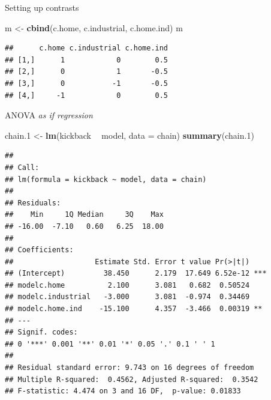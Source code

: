 \documentclass[ignorenonframetext,]{beamer}
\newenvironment{Shaded}{\begin{snugshade}}{\end{snugshade}}
\newcommand{\DataTypeTok}[1]{\textcolor[rgb]{0.13,0.29,0.53}{#1}}
\newcommand{\FloatTok}[1]{\textcolor[rgb]{0.00,0.00,0.81}{#1}}
\newcommand{\KeywordTok}[1]{\textcolor[rgb]{0.13,0.29,0.53}{\textbf{#1}}}
\newcommand{\NormalTok}[1]{#1}
\newcommand{\OperatorTok}[1]{\textcolor[rgb]{0.81,0.36,0.00}{\textbf{#1}}}
\newcommand{\StringTok}[1]{\textcolor[rgb]{0.31,0.60,0.02}{#1}}
\begin{document}
\begin{frame}[fragile]{Setting up contrasts}
\protect\hypertarget{setting-up-contrasts}{}

\begin{Shaded}
\begin{Highlighting}[]
\NormalTok{m <-}\StringTok{ }\KeywordTok{cbind}\NormalTok{(c.home, c.industrial, c.home.ind)}
\NormalTok{m}
\end{Highlighting}
\end{Shaded}

\begin{verbatim}
##      c.home c.industrial c.home.ind
## [1,]      1            0        0.5
## [2,]      0            1       -0.5
## [3,]      0           -1       -0.5
## [4,]     -1            0        0.5
\end{verbatim}

\begin{Shaded}
\end{Shaded}

\end{frame}

\begin{frame}[fragile]{ANOVA \emph{as if regression}}
\protect\hypertarget{anova-as-if-regression}{}

\scriptsize

\begin{Shaded}
\begin{Highlighting}[]
\NormalTok{chain}\FloatTok{.1}\NormalTok{ <-}\StringTok{ }\KeywordTok{lm}\NormalTok{(kickback }\OperatorTok{~}\StringTok{ }\NormalTok{model, }\DataTypeTok{data =}\NormalTok{ chain)}
\KeywordTok{summary}\NormalTok{(chain}\FloatTok{.1}\NormalTok{)}
\end{Highlighting}
\end{Shaded}

\begin{verbatim}
## 
## Call:
## lm(formula = kickback ~ model, data = chain)
## 
## Residuals:
##    Min     1Q Median     3Q    Max 
## -16.00  -7.10   0.60   6.25  18.00 
## 
## Coefficients:
##                   Estimate Std. Error t value Pr(>|t|)    
## (Intercept)         38.450      2.179  17.649 6.52e-12 ***
## modelc.home          2.100      3.081   0.682  0.50524    
## modelc.industrial   -3.000      3.081  -0.974  0.34469    
## modelc.home.ind    -15.100      4.357  -3.466  0.00319 ** 
## ---
## Signif. codes:  
## 0 '***' 0.001 '**' 0.01 '*' 0.05 '.' 0.1 ' ' 1
## 
## Residual standard error: 9.743 on 16 degrees of freedom
## Multiple R-squared:  0.4562, Adjusted R-squared:  0.3542 
## F-statistic: 4.474 on 3 and 16 DF,  p-value: 0.01833
\end{verbatim}

\normalsize

\end{frame}
\end{document}
